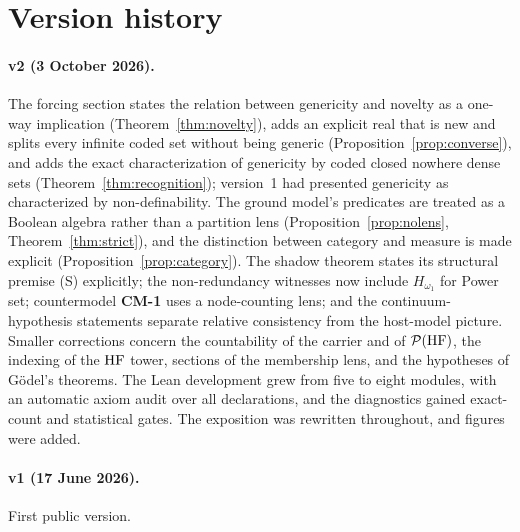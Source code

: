 \section{Version history}\label{app:versions}

\paragraph{v2 (3 October 2026).} The forcing section states the relation between genericity and
novelty as a one-way implication (Theorem~\ref{thm:novelty}), adds an explicit real that is new and
splits every infinite coded set without being generic (Proposition~\ref{prop:converse}), and adds
the exact characterization of genericity by coded closed nowhere dense sets
(Theorem~\ref{thm:recognition}); version~1 had presented genericity as characterized by
non-definability. The ground model's predicates are treated as a Boolean algebra rather than a
partition lens (Proposition~\ref{prop:nolens}, Theorem~\ref{thm:strict}), and the distinction
between category and measure is made explicit (Proposition~\ref{prop:category}). The shadow theorem
states its structural premise (S) explicitly; the non-redundancy witnesses now include
$H_{\omega_1}$ for Power set; countermodel \textbf{CM-1} uses a node-counting lens; and the
continuum-hypothesis statements separate relative consistency from the host-model picture. Smaller
corrections concern the countability of the carrier and of $\mathcal{P}(\mathrm{HF})$, the indexing of the
$\mathrm{HF}$ tower, sections of the membership lens, and the hypotheses of G\"odel's theorems. The Lean
development grew from five to eight modules, with an automatic axiom audit over all declarations,
and the diagnostics gained exact-count and statistical gates. The exposition was rewritten
throughout, and figures were added.

\paragraph{v1 (17 June 2026).} First public version.

